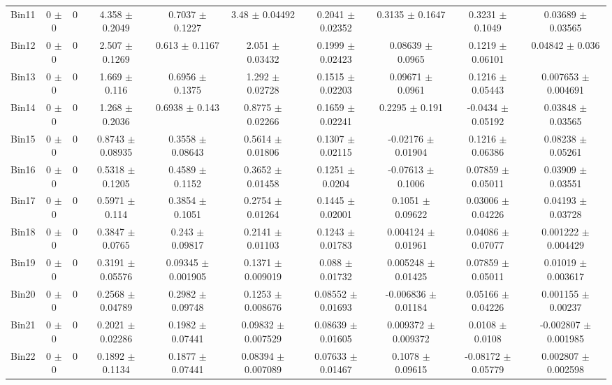 \begin{tabular}{@{\extracolsep{4pt}}lccccccccc@{}}
     Bin11 & 0 $\pm$ 0 & 0 & 4.358 $\pm$ 0.2049 & 0.7037 $\pm$ 0.1227 & 3.48 $\pm$ 0.04492 & 0.2041 $\pm$ 0.02352 & 0.3135 $\pm$ 0.1647 & 0.3231 $\pm$ 0.1049 & 0.03689 $\pm$ 0.03565 \\ 
     Bin12 & 0 $\pm$ 0 & 0 & 2.507 $\pm$ 0.1269 & 0.613 $\pm$ 0.1167 & 2.051 $\pm$ 0.03432 & 0.1999 $\pm$ 0.02423 & 0.08639 $\pm$ 0.0965 & 0.1219 $\pm$ 0.06101 & 0.04842 $\pm$ 0.036 \\ 
     Bin13 & 0 $\pm$ 0 & 0 & 1.669 $\pm$ 0.116 & 0.6956 $\pm$ 0.1375 & 1.292 $\pm$ 0.02728 & 0.1515 $\pm$ 0.02203 & 0.09671 $\pm$ 0.0961 & 0.1216 $\pm$ 0.05443 & 0.007653 $\pm$ 0.004691 \\ 
     Bin14 & 0 $\pm$ 0 & 0 & 1.268 $\pm$ 0.2036 & 0.6938 $\pm$ 0.143 & 0.8775 $\pm$ 0.02266 & 0.1659 $\pm$ 0.02241 & 0.2295 $\pm$ 0.191 & -0.0434 $\pm$ 0.05192 & 0.03848 $\pm$ 0.03565 \\ 
     Bin15 & 0 $\pm$ 0 & 0 & 0.8743 $\pm$ 0.08935 & 0.3558 $\pm$ 0.08643 & 0.5614 $\pm$ 0.01806 & 0.1307 $\pm$ 0.02115 & -0.02176 $\pm$ 0.01904 & 0.1216 $\pm$ 0.06386 & 0.08238 $\pm$ 0.05261 \\ 
     Bin16 & 0 $\pm$ 0 & 0 & 0.5318 $\pm$ 0.1205 & 0.4589 $\pm$ 0.1152 & 0.3652 $\pm$ 0.01458 & 0.1251 $\pm$ 0.0204 & -0.07613 $\pm$ 0.1006 & 0.07859 $\pm$ 0.05011 & 0.03909 $\pm$ 0.03551 \\ 
     Bin17 & 0 $\pm$ 0 & 0 & 0.5971 $\pm$ 0.114 & 0.3854 $\pm$ 0.1051 & 0.2754 $\pm$ 0.01264 & 0.1445 $\pm$ 0.02001 & 0.1051 $\pm$ 0.09622 & 0.03006 $\pm$ 0.04226 & 0.04193 $\pm$ 0.03728 \\ 
     Bin18 & 0 $\pm$ 0 & 0 & 0.3847 $\pm$ 0.0765 & 0.243 $\pm$ 0.09817 & 0.2141 $\pm$ 0.01103 & 0.1243 $\pm$ 0.01783 & 0.004124 $\pm$ 0.01961 & 0.04086 $\pm$ 0.07077 & 0.001222 $\pm$ 0.004429 \\ 
     Bin19 & 0 $\pm$ 0 & 0 & 0.3191 $\pm$ 0.05576 & 0.09345 $\pm$ 0.001905 & 0.1371 $\pm$ 0.009019 & 0.088 $\pm$ 0.01732 & 0.005248 $\pm$ 0.01425 & 0.07859 $\pm$ 0.05011 & 0.01019 $\pm$ 0.003617 \\ 
     Bin20 & 0 $\pm$ 0 & 0 & 0.2568 $\pm$ 0.04789 & 0.2982 $\pm$ 0.09748 & 0.1253 $\pm$ 0.008676 & 0.08552 $\pm$ 0.01693 & -0.006836 $\pm$ 0.01184 & 0.05166 $\pm$ 0.04226 & 0.001155 $\pm$ 0.00237 \\ 
     Bin21 & 0 $\pm$ 0 & 0 & 0.2021 $\pm$ 0.02286 & 0.1982 $\pm$ 0.07441 & 0.09832 $\pm$ 0.007529 & 0.08639 $\pm$ 0.01605 & 0.009372 $\pm$ 0.009372 & 0.0108 $\pm$ 0.0108 & -0.002807 $\pm$ 0.001985 \\ 
     Bin22 & 0 $\pm$ 0 & 0 & 0.1892 $\pm$ 0.1134 & 0.1877 $\pm$ 0.07441 & 0.08394 $\pm$ 0.007089 & 0.07633 $\pm$ 0.01467 & 0.1078 $\pm$ 0.09615 & -0.08172 $\pm$ 0.05779 & 0.002807 $\pm$ 0.002598 \\ 

\end{tabular}
